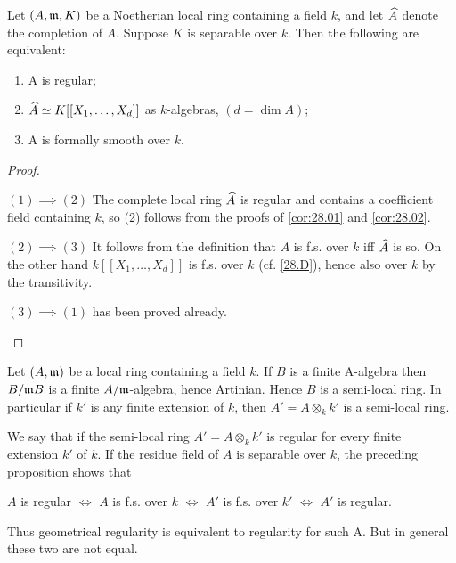 \documentclass[../main]{subfiles}
\begin{document}
\begin{parproposition}
 Let $(A, \mathfrak{m}, K)$ be a Noetherian local ring containing a field $k$, and let $\widehat{A}$ denote the completion of $A$. Suppose $K$ is separable over $k$. Then the following are equivalent:
 \begin{enumerate}[label = (\arabic*)]
     \item A is regular;
     \item $\widehat{A} \simeq K[[X_1, \dots, X_d]]$ as $k$-algebras, $(d=\dim A)$;
     \item A is formally smooth over $k$.
 \end{enumerate}
\end{parproposition}

\begin{proof}\phantom{,}
\begin{implyenumerate}
    \item[$(1) \implies (2)$] The complete local ring $\widehat{A}$ is regular and contains a coefficient field containing $k$, so (2) follows from the proofs of \ref{cor:28.01} and \ref{cor:28.02}.
    \item[$(2) \implies (3)$] It follows from the definition that $A$ is f.s. over $k$ iff $\widehat{A}$ is so. On the other hand $k[[X_1, \ldots, X_d]]$ is f.s. over $k$ (cf. \ref{28.D}), hence also over $k$ by the transitivity.
    \item[$(3)\implies (1)$] has been proved already.
\end{implyenumerate}
\end{proof}

\newparagraph Let $(A, \mathfrak{m})$ be a local ring containing a field $k$. If $B$ is a finite A-algebra then $B / \mathfrak{m} B$ is a finite $A / \mathfrak{m}$-algebra, hence Artinian. Hence $B$ is a semi-local ring. In particular if $k'$ is any finite extension of $k$, then $A'=A \otimes_k k'$ is a semi-local ring.

We say that  if the semi-local ring $A'=A \otimes_k k'$ is regular for every finite extension $k'$ of $k$. If the residue field of $A$ is separable over $k$, the preceding proposition shows that

$A$ is regular $\iff$ $A$ is f.s. over $k$ $\iff$ $A'$ is f.s. over $k'$ $\iff$ $A'$ is regular.

Thus geometrical regularity is equivalent to regularity for such A. But in general these two are not equal. 
\end{document}
